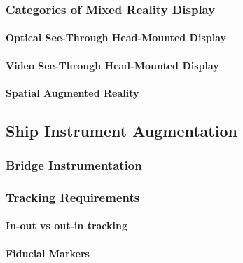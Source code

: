 \subsubsection{Categories of Mixed Reality Display}
\paragraph{Optical See-Through Head-Mounted Display}

\paragraph{Video See-Through Head-Mounted Display}

\paragraph{Spatial Augmented Reality}

\subsection{Ship Instrument Augmentation}

\subsubsection{Bridge Instrumentation}

\subsubsection{Tracking Requirements}

\paragraph{In-out vs out-in tracking}

\paragraph{Fiducial Markers}
